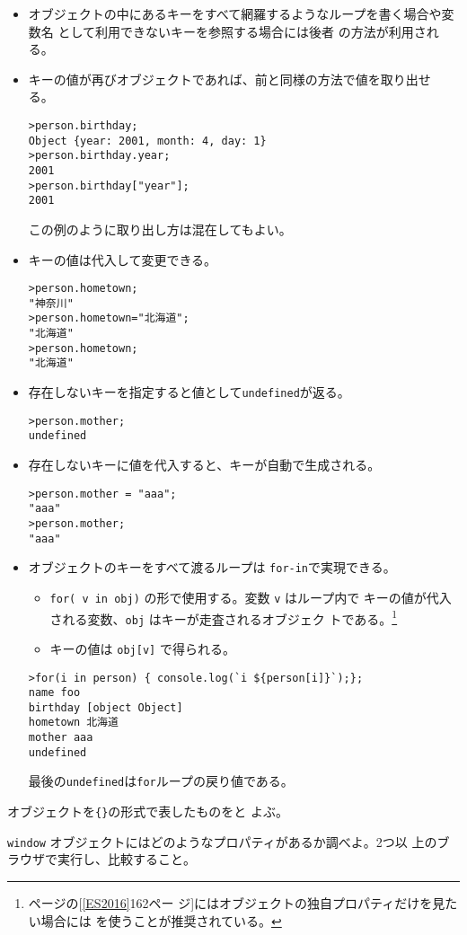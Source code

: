 \begin{Exec}
\begin{itemize}
 \item オブジェクトの中にあるキーをすべて網羅するようなループを書く場合や変数名
       として利用できないキーを参照する場合には後者
       の方法が利用される。
 \item キーの値が再びオブジェクトであれば、前と同様の方法で値を取り出せ
       る。
\begin{Verbatim}
>person.birthday;
Object {year: 2001, month: 4, day: 1}
>person.birthday.year;
2001
>person.birthday["year"];
2001
\end{Verbatim}
この例のように取り出し方は混在してもよい。
 \item キーの値は代入して変更できる。
\begin{Verbatim}
>person.hometown;
"神奈川"
>person.hometown="北海道";
"北海道"
>person.hometown;
"北海道"
\end{Verbatim}
 \item 存在しないキーを指定すると値として\verb+undefined+が返る。
\begin{Verbatim}
>person.mother;
undefined
\end{Verbatim}
 \item 存在しないキーに値を代入すると、キーが自動で生成される。
\begin{Verbatim}
>person.mother = "aaa";
"aaa"
>person.mother;
"aaa"
\end{Verbatim}
 \item オブジェクトのキーをすべて渡るループは \verb+for-in+で実現できる。
\begin{itemize}
 \item \verb+for( v in obj)+ の形で使用する。変数 \verb+v+ はループ内で
       キーの値が代入される変数、\verb+obj+ はキーが走査されるオブジェク
       トである。\footnote{\pageref{ES2016}ページの[\ref{ES2016}162ペー
       ジ]にはオブジェクトの独自プロパティだけを見たい場合には
       を使うことが推奨されている。}
 \item キーの値は \verb+obj[v]+ で得られる。
\end{itemize}
\begin{Verbatim}
>for(i in person) { console.log(`i ${person[i]}`);};
name foo
birthday [object Object]
hometown 北海道
mother aaa
undefined
\end{Verbatim}
最後の\verb+undefined+は\verb+for+ループの戻り値である。
\end{itemize}
\end{Exec}
オブジェクトを\verb+{}+の形式で表したものをと
よぶ。
\begin{Prob}\upshape
\verb+window+ オブジェクトにはどのようなプロパティがあるか調べよ。2つ以
 上のブラウザで実行し、比較すること。
\end{Prob}
